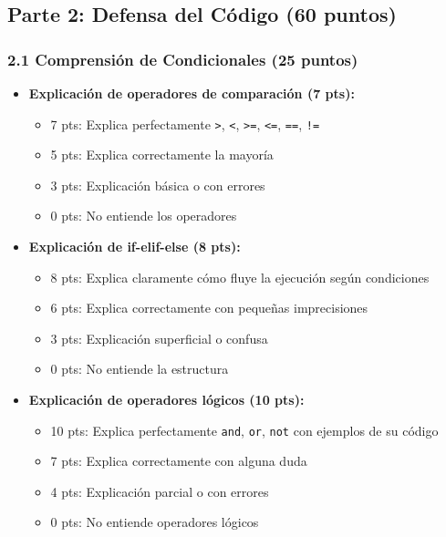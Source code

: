 \documentclass[12pt,a4paper]{article}
\begin{document}
\subsection{Parte 2: Defensa del Código (60 puntos)}

\subsubsection{2.1 Comprensión de Condicionales (25 puntos)}

\begin{itemize}[leftmargin=*]
    \item \textbf{Explicación de operadores de comparación (7 pts):}
    \begin{itemize}
        \item 7 pts: Explica perfectamente \texttt{>}, \texttt{<}, \texttt{>=}, \texttt{<=}, \texttt{==}, \texttt{!=}
        \item 5 pts: Explica correctamente la mayoría
        \item 3 pts: Explicación básica o con errores
        \item 0 pts: No entiende los operadores
    \end{itemize}
    
    \item \textbf{Explicación de if-elif-else (8 pts):}
    \begin{itemize}
        \item 8 pts: Explica claramente cómo fluye la ejecución según condiciones
        \item 6 pts: Explica correctamente con pequeñas imprecisiones
        \item 3 pts: Explicación superficial o confusa
        \item 0 pts: No entiende la estructura
    \end{itemize}
    
    \item \textbf{Explicación de operadores lógicos (10 pts):}
    \begin{itemize}
        \item 10 pts: Explica perfectamente \texttt{and}, \texttt{or}, \texttt{not} con ejemplos de su código
        \item 7 pts: Explica correctamente con alguna duda
        \item 4 pts: Explicación parcial o con errores
        \item 0 pts: No entiende operadores lógicos
    \end{itemize}
\end{itemize}
\end{document}
